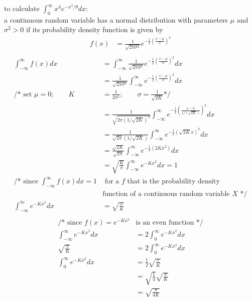 \documentclass[12pt,border=4pt,multi]{article} %
\begin{document}
to calculate $\int_0^{\infty} x^4 e^{-x^2 / \theta} dx$:\\ 
a continuous random variable has a normal distribution with parameters $\mu$ and $\sigma^2 > 0$ if its probability density function is given by
{\large
\begin{align*}
f(x) &= \frac{1}{\sqrt{2\pi\sigma^2}} e^{-\frac{1}{2}\left(\frac{x - \mu}{\sigma}\right)^2}\\
\end{align*}}
\begin{align*}
\int_{-\infty}^{\infty} f(x) dx &= \int_{-\infty}^{\infty} \frac{1}{\sqrt{2\pi\sigma^2}} e^{-\frac{1}{2}\left(\frac{x - \mu}{\sigma}\right)^2} dx\\
&= \frac{1}{\sqrt{2\pi\sigma^2}} \int_{-\infty}^{\infty} e^{-\frac{1}{2}\left(\frac{x - \mu}{\sigma}\right)^2} dx\\
\text{/* set } \mu = 0; \qquad K &= \frac{1}{2\sigma^2}; \qquad \sigma = \frac{1}{\sqrt{2K}} \text{*/}\\
&= \frac{1}{\sqrt{2\pi(1/\sqrt{2K})^2}} \int_{-\infty}^{\infty} e^{-\frac{1}{2}\left(\frac{x - 0}{1/(\sqrt{2K})}\right)^2} dx\\
&= \frac{1}{\sqrt{2\pi}(1/\sqrt{2K})} \int_{-\infty}^{\infty} e^{-\frac{1}{2}\left(\sqrt{2K}x\right)^2} dx\\
&= \frac{\sqrt{2K}}{\sqrt{2\pi}} \int_{-\infty}^{\infty} e^{-\frac{1}{2}\left(2Kx^2\right)} dx\\
&= \sqrt{\frac{K}{\pi}} \int_{-\infty}^{\infty} e^{-Kx^2} dx = 1\\
\text{/* since } \int_{-\infty}^{\infty} f(x)dx  = 1 &\text{ for a $f$ that is the probability density}\\
&\text{function of a continuous random variable $X$}\text{ */}\\
\int_{-\infty}^{\infty} e^{-Kx^2} dx &= \sqrt{\frac{\pi}{K}}\\
\end{align*}
\begin{align*}
\text{/* since } f(x) = e^{-Kx^2} &\text{is an even function */}\\
\int_{-\infty}^{\infty} e^{-Kx^2} dx &= 2\int_0^{\infty} e^{-Kx^2} dx\\
\sqrt{\frac{\pi}{K}} &=  2\int_0^{\infty} e^{-Kx^2} dx\\
\int_0^{\infty} e^{-Kx^2} dx &= \frac{1}{2}\sqrt{\frac{\pi}{K}}\\
&= \sqrt{\frac{1}{4}}\sqrt{\frac{\pi}{K}}\\
&= \sqrt{\frac{\pi}{4K}}\\
\end{align*}
\end{document}
